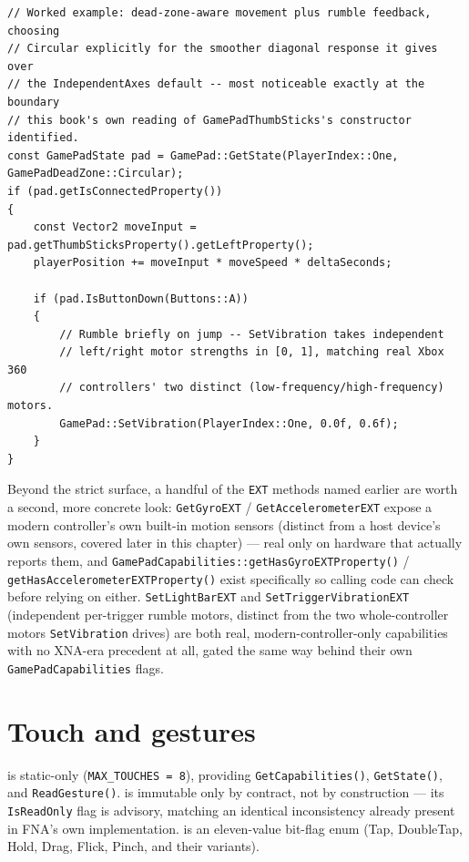 \begin{lstlisting}
// Worked example: dead-zone-aware movement plus rumble feedback, choosing
// Circular explicitly for the smoother diagonal response it gives over
// the IndependentAxes default -- most noticeable exactly at the boundary
// this book's own reading of GamePadThumbSticks's constructor identified.
const GamePadState pad = GamePad::GetState(PlayerIndex::One, GamePadDeadZone::Circular);
if (pad.getIsConnectedProperty())
{
    const Vector2 moveInput = pad.getThumbSticksProperty().getLeftProperty();
    playerPosition += moveInput * moveSpeed * deltaSeconds;

    if (pad.IsButtonDown(Buttons::A))
    {
        // Rumble briefly on jump -- SetVibration takes independent
        // left/right motor strengths in [0, 1], matching real Xbox 360
        // controllers' two distinct (low-frequency/high-frequency) motors.
        GamePad::SetVibration(PlayerIndex::One, 0.0f, 0.6f);
    }
}
\end{lstlisting}

Beyond the strict surface, a handful of the \texttt{EXT} methods named earlier are worth a
second, more concrete look: \texttt{GetGyroEXT} / \texttt{GetAccelerometerEXT} expose a modern
controller's own built-in motion sensors (distinct from a host device's own sensors, covered
later in this chapter) --- real only on hardware that actually reports them, and
\texttt{GamePadCapabilities::getHasGyroEXTProperty()} / \texttt{getHasAccelerometerEXTProperty()}
exist specifically so calling code can check before relying on either. \texttt{SetLightBarEXT}
and \texttt{SetTriggerVibrationEXT} (independent per-trigger rumble motors, distinct from the
two whole-controller motors \texttt{SetVibration} drives) are both real, modern-controller-only
capabilities with no XNA-era precedent at all, gated the same way behind their own
\texttt{GamePadCapabilities} flags.

\section{Touch and gestures}

 is static-only (\texttt{MAX\_TOUCHES = 8}), providing
\texttt{GetCapabilities()}, \texttt{GetState()}, and \texttt{ReadGesture()}.
 is immutable only by contract, not by construction --- its
\texttt{IsReadOnly} flag is advisory, matching an identical inconsistency already present in
FNA's own implementation.  is an eleven-value bit-flag enum (Tap,
DoubleTap, Hold, Drag, Flick, Pinch, and their variants).

